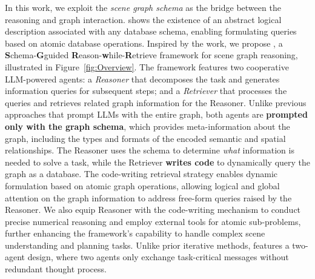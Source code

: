 
In this work, we exploit the \textit{scene graph schema} as the bridge between the reasoning and graph interaction. 
\citet{FOLDatabase} shows the existence of an abstract logical description associated with any database schema, enabling formulating queries based on atomic database operations.
Inspired by the work, we propose \RwR, a \textbf{S}chema-\textbf{G}guided \textbf{R}eason-\textbf{w}hile-\textbf{R}etrieve framework for scene graph reasoning, illustrated in Figure~\ref{fig:Overview}. 
The framework features two cooperative LLM-powered agents: a \textit{Reasoner} that decomposes the task and generates information queries for subsequent steps; and a \textit{Retriever} that processes the queries and retrieves related graph information for the Reasoner. 
Unlike previous approaches that prompt LLMs with the entire graph, both agents are \textbf{prompted only with the graph schema}, which provides meta-information about the graph, including the types and formats of the encoded semantic and spatial relationships.
The Reasoner uses the schema to determine \textit{what} information is needed to solve a task, while the Retriever \textbf{writes code} to dynamically query the graph as a database.
The code-writing retrieval strategy enables dynamic formulation based on atomic graph operations, allowing logical and global attention on the graph information to address free-form queries raised by the Reasoner.
We also equip Reasoner with the code-writing mechanism to conduct precise numerical reasoning \citep{lyu2023faithful} and employ external tools for atomic sub-problems, further enhancing the framework's capability to handle complex scene understanding and planning tasks.
Unlike prior iterative methods, \RwR features a two-agent design, where two agents only exchange task-critical messages without redundant thought process. 
